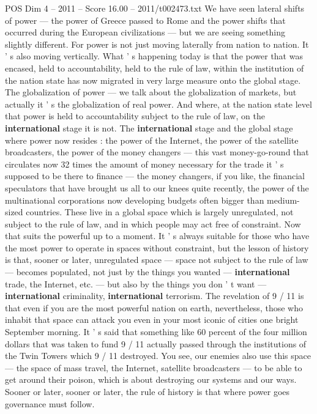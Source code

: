 \begin{textsample}{POS Dim 4 – 2011 – Score 16.00 – 2011/t002473.txt}
We have seen lateral shifts of power — the power of Greece passed to Rome and the power shifts that occurred during the European civilizations — but we are seeing something slightly different.
For power is not just moving laterally from nation to nation.
It ' s also moving vertically.
What ' s happening today is that the power that was encased, held to accountability, held to the rule of law, within the institution of the nation state has now migrated in very large measure onto the global stage.
The globalization of power — we talk about the globalization of markets, but actually it ' s the globalization of real power.
And where, at the nation state level that power is held to accountability subject to the rule of law, on the \textbf{international} stage it is not.
The \textbf{international} stage and the global stage where power now resides : the power of the Internet, the power of the satellite broadcasters, the power of the money changers — this vast money-go-round that circulates now 32 times the amount of money necessary for the trade it ' s supposed to be there to finance — the money changers, if you like, the financial speculators that have brought us all to our knees quite recently, the power of the multinational corporations now developing budgets often bigger than medium-sized countries.
These live in a global space which is largely unregulated, not subject to the rule of law, and in which people may act free of constraint.
Now that suits the powerful up to a moment.
It ' s always suitable for those who have the most power to operate in spaces without constraint, but the lesson of history is that, sooner or later, unregulated space — space not subject to the rule of law — becomes populated, not just by the things you wanted — \textbf{international} trade, the Internet, etc. — but also by the things you don ' t want — \textbf{international} criminality, \textbf{international} terrorism.
The revelation of 9 / 11 is that even if you are the most powerful nation on earth, nevertheless, those who inhabit that space can attack you even in your most iconic of cities one bright September morning.
It ' s said that something like 60 percent of the four million dollars that was taken to fund 9 / 11 actually passed through the institutions of the Twin Towers which 9 / 11 destroyed.
You see, our enemies also use this space — the space of mass travel, the Internet, satellite broadcasters — to be able to get around their poison, which is about destroying our systems and our ways.
Sooner or later, sooner or later, the rule of history is that where power goes governance must follow.

\end{textsample}
